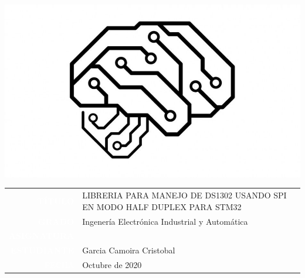 \documentclass[10pt,a4paper,oneside]{article}
\begin{document}
\pagestyle{empty}

\begin{center} 
\includegraphics[scale=0.4]{Imagenes/PCB_Brain_circuit.png} 
\end{center}

\large

\vspace{3cm}

\begin{center}
{\setlength\arrayrulewidth{2pt}
\begin{tabular}{r|p{9.8cm}}
\arrayrulecolor{udc}
\colorbox{udc}{\textcolor{white}{\bf TÍTULO}}      
&	LIBRERIA PARA MANEJO DE DS1302 USANDO SPI EN MODO HALF DUPLEX PARA STM32  \\[2cm]
\colorbox{udc}{\textcolor{white}{\bf GRADO}}       & Ingenería Electrónica Industrial y Automática    \\[1cm]
\colorbox{udc}{\textcolor{white}{\bf ASIGNATURA}}  &     \\[2cm]
\colorbox{udc}{\textcolor{white}{\bf ESTUDIANTE}}  &	Garcia Camoira Cristobal  \\[2cm]
\colorbox{udc}{\textcolor{white}{FECHA}}       &	Octubre de 2020
\end{tabular}}
\end{center}
\normalsize
\cleardoublepage
\end{document}
